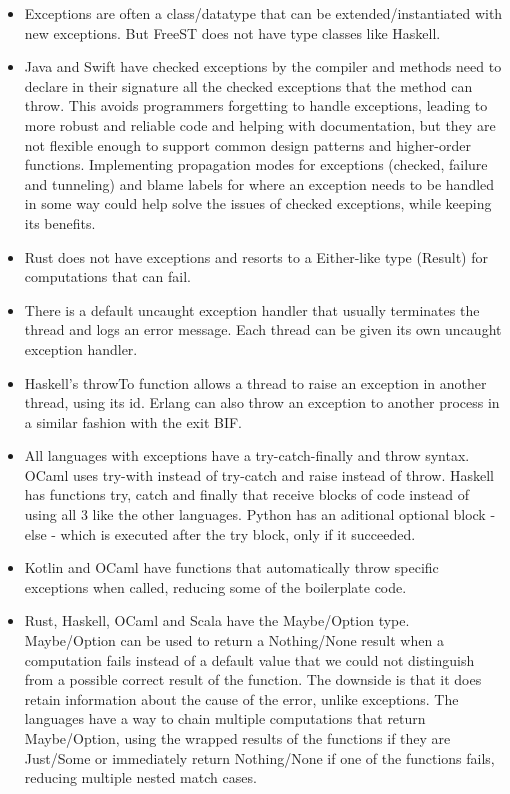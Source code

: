 \documentclass[a4paper,11pt]{article}
\theoremstyle{plain}
\theoremstyle{nonumberplain}
\begin{document}
\begin{itemize}
  \item Exceptions are often a class/datatype that can be extended/instantiated with new exceptions. But FreeST does not have type classes like Haskell.
  \item Java and Swift have checked exceptions by the compiler and methods need to declare in their signature all the checked exceptions that the method can throw. This avoids programmers forgetting to handle exceptions, leading to more robust and reliable code and helping with documentation, but they are not flexible enough to support common design patterns and higher-order functions. Implementing propagation modes for exceptions (checked, failure and tunneling) and blame labels for where an exception needs to be handled in some way could help solve the issues of checked exceptions, while keeping its benefits.
  \item Rust does not have exceptions and resorts to a Either-like type (Result) for computations that can fail.
  \item There is a default uncaught exception handler that usually terminates the thread and logs an error message. Each thread can be given its own uncaught exception handler.
  \item Haskell's throwTo function allows a thread to raise an exception in another thread, using its id. Erlang can also throw an exception to another process in a similar fashion with the exit BIF.
  \item All languages with exceptions have a try-catch-finally and throw syntax. OCaml uses try-with instead of try-catch and raise instead of throw. Haskell has functions try, catch and finally that receive blocks of code instead of using all 3 like the other languages. Python has an aditional optional block - else - which is executed after the try block, only if it succeeded.
  \item Kotlin and OCaml have functions that automatically throw specific exceptions when called, reducing some of the boilerplate code.
  \item Rust, Haskell, OCaml and Scala have the Maybe/Option type. Maybe/Option can be used to return a Nothing/None result when a computation fails instead of a default value that we could not distinguish from a possible correct result of the function. The downside is that it does retain information about the cause of the error, unlike exceptions. The languages have a way to chain multiple computations that return Maybe/Option, using the wrapped results of the functions if they are Just/Some or immediately return Nothing/None if one of the functions fails, reducing multiple nested match cases.

\end{itemize}
\end{document}
